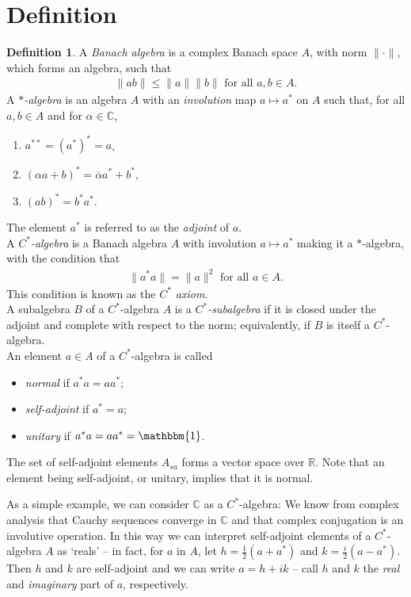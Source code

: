\documentclass[12pt,a4paper]{report}
\theoremstyle{plain}
\theoremstyle{definition}
\newtheorem{defn}{Definition}
\newcommand{\1}{\mathbbm{1}}
\newcommand{\C}{\mathbb{C}}
\newcommand{\R}{\mathbb{R}}
\begin{document}
\section{Definition}
\begin{defn}
	A \emph{Banach algebra} is a complex Banach space $A$, with norm $\|\cdot\|$, which forms an 
	algebra, such that 
	\begin{align*}
		\|ab\| \leq \|a\| \|b\| \mbox{ for all } a,b \in A.
	\end{align*}
	A \emph{$\ast$-algebra} is an algebra $A$ with an \emph{involution} map 
	$a \mapsto a^\ast$ on $A$ such that, for all $a,b \in A$ and for $\alpha \in \C$,
	
	\begin{enumerate}
		\item $a^{\ast\ast} = (a^\ast)^\ast = a$,
		\item $(\alpha a+b)^\ast = \overline{\alpha} a^\ast + b^\ast$,
		\item $(ab)^\ast = b^\ast a^\ast$.
	\end{enumerate}
	The element $a^\ast$ is referred to as the \emph{adjoint} of $a$. 		\\
	A \emph{$C^\ast$-algebra} is a Banach algebra $A$ with involution $a \mapsto a^\ast$ making it a 
	$\ast$-algebra, with the condition that
	\begin{align*}
		\|a ^\ast a\| = \|a\|^2 \mbox{ for all } a \in A.
	\end{align*}
	This condition is known as the \emph{$C^\ast$ axiom}.\\
	A subalgebra $B$ of a $C^\ast$-algebra $A$ is a \emph{$C^\ast$-subalgebra} if it is closed under the 
	adjoint and complete with respect to the norm; equivalently, if $B$ is itself a $C^\ast$-algebra.\\
	An element $a\in A$ of a $C^\ast$-algebra is called
	\begin{itemize}
		\item	\emph{normal} if $a^\ast a=aa^\ast$;
		\item 	\emph{self-adjoint} if $a^\ast=a$;
		\item 	\emph{unitary} if $a^\ast a = aa^\ast =\1$. 
	\end{itemize}
\end{defn}
The set of self-adjoint elements $A_{sa}$ forms a vector space over $\R$.
Note that an element being self-adjoint, or unitary, implies that it is normal.

As a simple example, we can consider $\C$ as a $C^\ast$-algebra: We know from complex analysis that 
Cauchy sequences converge in $\C$ and that complex conjugation is an involutive operation. In this way 
we can interpret self-adjoint elements of a $C^\ast$-algebra $A$ as `reals' -- in fact, for $a$ in $A$, 
let $h=\tfrac{1}{2}(a+a^\ast)$ and $k=\tfrac{i}{2}(a-a^\ast)$. Then $h$ and $k$ are self-adjoint and we 
can write $a=h+ik$ -- call $h$ and $k$ the \emph{real} and \emph{imaginary} part of $a$, respectively. 
\end{document}

